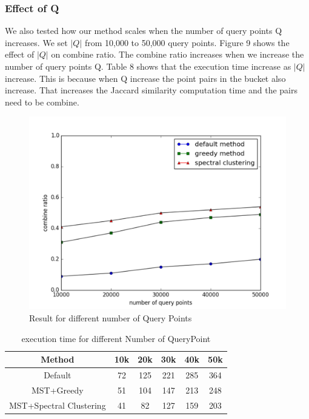 \documentclass{vldb}
\begin{document}
\subsubsection{Effect of Q}
We also tested how our method scales when the number of query points Q increases. We set $\lvert Q \rvert$ from 10,000 to 50,000 query points. Figure 9 shows the effect of $\lvert Q \rvert$ on combine ratio. The combine ratio increases when we increase the number of query points Q. Table 8 shows that the execution time increase as $\lvert Q \rvert$ increase. This is because when Q increase the point pairs in the bucket also increase. That increases the Jaccard similarity computation time and the pairs need to be combine.
\begin{figure}
\centering
\includegraphics[scale=0.45]{FQueryPoints}
\caption{Result for different number of Query Points}
\label{fig:QueryPoints}
\end{figure}

\begin{table} [h]
\centering
\caption{execution time for different Number of QueryPoint}
\label{tab:table}
\begin{tabular}{|c|c|c|c|c|c|} \hline
Method & 10k & 20k & 30k & 40k & 50k \\\hline
Default & 72 & 125 & 221 & 285 & 364\\\hline
MST+Greedy & 51 & 104 & 147 & 213 & 248 \\\hline
MST+Spectral Clustering & 41 & 82 & 127 & 159 & 203\\\hline
\end{tabular}\\
\end{table}
\end{document}
